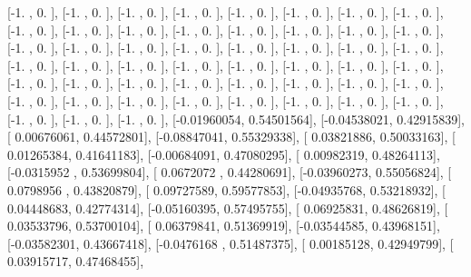 \documentclass{article}
\begin{document}
       [-1.        ,  0.        ],
       [-1.        ,  0.        ],
       [-1.        ,  0.        ],
       [-1.        ,  0.        ],
       [-1.        ,  0.        ],
       [-1.        ,  0.        ],
       [-1.        ,  0.        ],
       [-1.        ,  0.        ],
       [-1.        ,  0.        ],
       [-1.        ,  0.        ],
       [-1.        ,  0.        ],
       [-1.        ,  0.        ],
       [-1.        ,  0.        ],
       [-1.        ,  0.        ],
       [-1.        ,  0.        ],
       [-1.        ,  0.        ],
       [-1.        ,  0.        ],
       [-1.        ,  0.        ],
       [-1.        ,  0.        ],
       [-1.        ,  0.        ],
       [-1.        ,  0.        ],
       [-1.        ,  0.        ],
       [-1.        ,  0.        ],
       [-1.        ,  0.        ],
       [-1.        ,  0.        ],
       [-1.        ,  0.        ],
       [-1.        ,  0.        ],
       [-1.        ,  0.        ],
       [-1.        ,  0.        ],
       [-1.        ,  0.        ],
       [-1.        ,  0.        ],
       [-1.        ,  0.        ],
       [-1.        ,  0.        ],
       [-1.        ,  0.        ],
       [-1.        ,  0.        ],
       [-1.        ,  0.        ],
       [-1.        ,  0.        ],
       [-1.        ,  0.        ],
       [-1.        ,  0.        ],
       [-1.        ,  0.        ],
       [-1.        ,  0.        ],
       [-1.        ,  0.        ],
       [-1.        ,  0.        ],
       [-1.        ,  0.        ],
       [-1.        ,  0.        ],
       [-1.        ,  0.        ],
       [-1.        ,  0.        ],
       [-1.        ,  0.        ],
       [-1.        ,  0.        ],
       [-1.        ,  0.        ],
       [-1.        ,  0.        ],
       [-0.01960054,  0.54501564],
       [-0.04538021,  0.42915839],
       [ 0.00676061,  0.44572801],
       [-0.08847041,  0.55329338],
       [ 0.03821886,  0.50033163],
       [ 0.01265384,  0.41641183],
       [-0.00684091,  0.47080295],
       [ 0.00982319,  0.48264113],
       [-0.0315952 ,  0.53699804],
       [ 0.0672072 ,  0.44280691],
       [-0.03960273,  0.55056824],
       [ 0.0798956 ,  0.43820879],
       [ 0.09727589,  0.59577853],
       [-0.04935768,  0.53218932],
       [ 0.04448683,  0.42774314],
       [-0.05160395,  0.57495755],
       [ 0.06925831,  0.48626819],
       [ 0.03533796,  0.53700104],
       [ 0.06379841,  0.51369919],
       [-0.03544585,  0.43968151],
       [-0.03582301,  0.43667418],
       [-0.0476168 ,  0.51487375],
       [ 0.00185128,  0.42949799],
       [ 0.03915717,  0.47468455],
\end{document}
